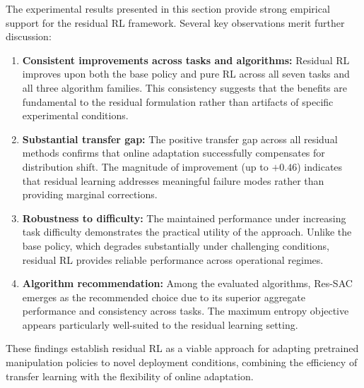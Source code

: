 The experimental results presented in this section provide strong empirical support for the residual \ac{RL} framework. Several key observations merit further discussion:

\begin{enumerate}
    \item \textbf{Consistent improvements across tasks and algorithms:} Residual \ac{RL} improves upon both the base policy and pure \ac{RL} across all seven tasks and all three algorithm families. This consistency suggests that the benefits are fundamental to the residual formulation rather than artifacts of specific experimental conditions.
    
    \item \textbf{Substantial transfer gap:} The positive transfer gap across all residual methods confirms that online adaptation successfully compensates for distribution shift. The magnitude of improvement (up to $+0.46$) indicates that residual learning addresses meaningful failure modes rather than providing marginal corrections.
    
    \item \textbf{Robustness to difficulty:} The maintained performance under increasing task difficulty demonstrates the practical utility of the approach. Unlike the base policy, which degrades substantially under challenging conditions, residual \ac{RL} provides reliable performance across operational regimes.
    
    \item \textbf{Algorithm recommendation:} Among the evaluated algorithms, Res-SAC emerges as the recommended choice due to its superior aggregate performance and consistency across tasks. The maximum entropy objective appears particularly well-suited to the residual learning setting.
\end{enumerate}

These findings establish residual \ac{RL} as a viable approach for adapting pretrained manipulation policies to novel deployment conditions, combining the efficiency of transfer learning with the flexibility of online adaptation.
